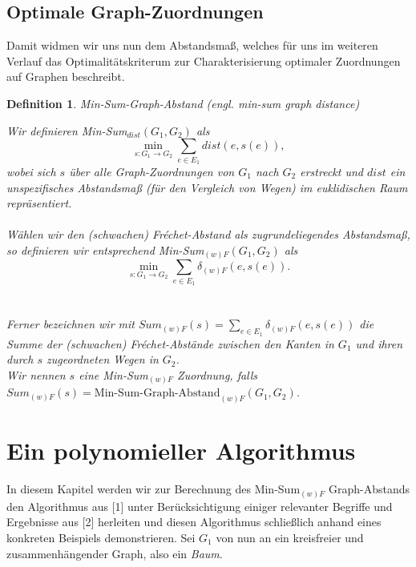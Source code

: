 \documentclass[a4paper, 12pt, twoside]{article}
\theoremstyle{Format1} %
\newtheorem{Def}{Definition}[section]       %
\begin{document}
\subsection{Optimale Graph-Zuordnungen} \label{Optimale Graphzuordnungen}
Damit widmen wir uns nun dem Abstandsmaß, welches für uns im weiteren Verlauf das Optimalitätskriterum zur Charakterisierung optimaler Zuordnungen auf Graphen beschreibt.

\begin{Def} \label{Definition Min-Sum}
	Min-Sum-Graph-Abstand (engl. min-sum graph distance)

	Wir definieren \textit{Min-Sum}$_{dist}(G_1, G_2)$ als
	$$\min_{s: G_1 \to G_2} \sum_{e \in E_1} dist(e, s(e)),$$
	wobei sich $s$ über alle Graph-Zuordnungen von $G_1$ nach $G_2$ erstreckt und $dist$ ein unspezifisches Abstandsmaß (für den Vergleich von Wegen)
	im euklidischen Raum repräsentiert.
	\\
	\\
	Wählen wir den (schwachen) Fréchet-Abstand als zugrundeliegendes Abstandsmaß, so definieren wir entsprechend
	\textit{Min-Sum}$_{(w)F}(G_1, G_2)$ als $$\min_{s: G_1 \to G_2} \sum_{e \in E_1} \delta_{(w)F}(e, s(e)).$$
	\\
	\\
	Ferner bezeichnen wir mit $Sum_{(w)F}(s) = \sum_{e \in E_1}\delta_{(w)F}(e, s(e))$ die Summe der (schwachen) Fréchet-Abstände zwischen den Kanten
	in $G_1$ und ihren durch $s$ zugeordneten Wegen in $G_2$.
	\\
	Wir nennen $s$ eine Min-Sum$_{(w)F}$ Zuordnung, falls
	\\
	$Sum_{(w)F}(s) = \text{Min-Sum-Graph-Abstand}_{(w)F}(G_1,G_2)$.

\end{Def}

\section{Ein polynomieller Algorithmus}

In diesem Kapitel werden wir zur Berechnung des Min-Sum$_{(w)F}$ Graph-Abstands den Algorithmus aus [1] unter Berücksichtigung einiger relevanter
Begriffe und Ergebnisse aus [2] herleiten und diesen Algorithmus schließlich anhand eines konkreten Beispiels demonstrieren.
Sei $G_1$ von nun an ein kreisfreier und zusammenhängender Graph, also ein \textit{Baum}.
\end{document}
